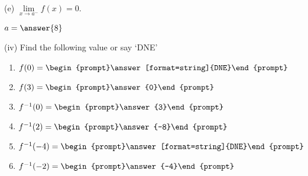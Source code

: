 \documentclass{ximera}
\begin{document}
\begin{exercise}
(e) $\lim\limits_{x\to a^-} f(x)=0$.
\begin{prompt}
\begin{multipleChoice}
\end{multipleChoice}

\begin{exercise}
$a=\answer{8}$
\end{exercise}
\end{prompt}

(iv) Find the following value or say `DNE'
\begin{enumerate}
\item $f(0)=\begin{prompt}\answer[format=string]{DNE}\end{prompt}$

\item $f(3)=\begin{prompt}\answer{0}\end{prompt}$

\item  $f^{-1}(0)=\begin{prompt}\answer{3}\end{prompt}$

\item $f^{-1}(2)=\begin{prompt}\answer{-8}\end{prompt}$

\item $f^{-1}(-4)=\begin{prompt}\answer[format=string]{DNE}\end{prompt}$

\item $f^{-1}(-2)=\begin{prompt}\answer{-4}\end{prompt}$
\end{enumerate}
\end{exercise}
\end{document}
